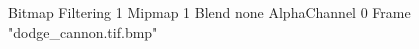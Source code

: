 {Bitmap
	{Filtering 1}
	{Mipmap 1}
	{Blend none}
	{AlphaChannel 0}
	{Frame "dodge_cannon.tif.bmp"}
}
